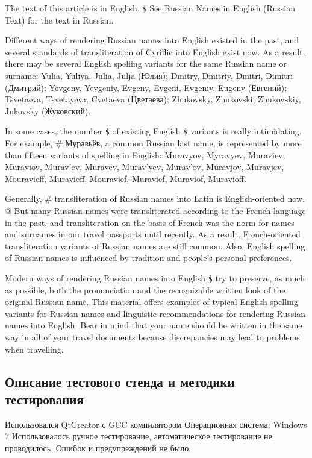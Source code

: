 \documentclass[12pt,a4paper]{report}
\begin{document}
\begin{enumerate}
The text of this article is in English. \verb-$- See Russian Names in English (Russian Text) for the text in Russian.
 
Different ways of rendering Russian names into English existed in the past, and several standards of transliteration of Cyrillic into English exist now. As a result, there may be several English spelling variants for the same Russian name or surname: Yulia, Yuliya, Julia, Julja (Юлия); Dmitry, Dmitriy, Dmitri, Dimitri (Дмитрий); Yevgeny, Yevgeniy, Evgeny, Evgeni, Evgeniy, Eugeny (Евгений); Tsvetaeva, Tsvetayeva, Cvetaeva (Цветаева); Zhukovsky, Zhukovski, Zhukovskiy, Jukovsky (Жуковский).
 
In some cases, the number \verb-$- of existing English \verb-$- variants is really intimidating. For example, # Муравьёв, a common Russian last name, is represented by more than fifteen variants of spelling in English: Muravyov, Myravyev, Muraviev, Muraviov, Murav'ev, Muravev, Murav'yev, Murav'ov, Muravjov, Muravjev, Mouravieff, Muravieff, Mouravief, Muravief, Muraviof, Muravioff.
 
Generally, # transliteration of Russian names into Latin is English-oriented now. @ But many Russian names were transliterated according to the French language in the past, and transliteration on the basis of French was the norm for names and surnames in our travel passports until recently. As a result, French-oriented transliteration variants of Russian names are still common. Also, English spelling of Russian names is influenced by tradition and people's personal preferences.
 
Modern ways of rendering Russian names into English \verb-$- try to preserve, as much as possible, both the pronunciation and the recognizable written look of the original Russian name. This material offers examples of typical English spelling variants for Russian names and linguistic recommendations for rendering Russian names into English. Bear in mind that your name should be written in the same way in all of your travel documents because discrepancies may lead to problems when travelling.
\end{enumerate}
\subsection{Описание тестового стенда и методики тестирования}
Использовался QtCreator с GCC компилятором
Операционная система: Windows 7
Использовалось ручное тестирование, автоматическое тестирование не проводилось.
Ошибок и предупреждений не было.
\end{document}
